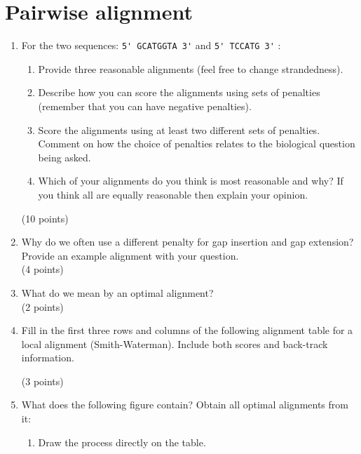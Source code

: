 \documentclass[11pt]{article}
\begin{document}
\section{Pairwise alignment}
\begin{enumerate}
\item For the two sequences: \verb|5' GCATGGTA 3'| and \verb|5' TCCATG 3'| :
  \begin{enumerate}
    \item Provide three reasonable alignments (feel free to change strandedness).
    \item Describe how you can score the alignments using sets of penalties
      (remember that you can have negative penalties).
    \item Score the alignments using at least two different sets of
      penalties. Comment on how the choice of penalties relates to the
      biological question being asked.
    \item Which of your alignments do you think is most reasonable and why? If you
      think all are equally reasonable then explain your opinion.
  \end{enumerate}
  (10 points)
\item Why do we often use a different penalty for gap insertion and gap
  extension? Provide an example alignment with your question.\\
  (4 points)
\item What do we mean by an optimal alignment?\\
  (2 points)
\item Fill in the first three rows and columns of the following
  alignment table for a local alignment (Smith-Waterman). Include
  both scores and back-track information.
  \begin{figure}[H]
    \begin{tikzpicture}[scale=0.6]
      
    \end{tikzpicture}
  \end{figure}
  (3 points)
\item What does the following figure contain?
  Obtain all optimal alignments from it:
  \begin{figure}[H]
    \begin{tikzpicture}[scale=0.6]
      
    \end{tikzpicture}
  \end{figure}
  \begin{enumerate}
  \item Draw the process directly on the table.

\end{enumerate}
\end{enumerate}
\end{document}

